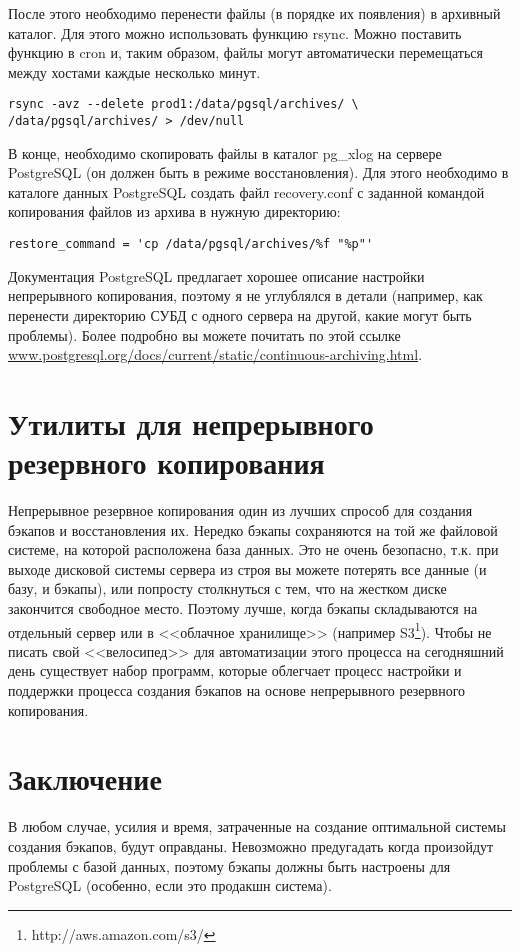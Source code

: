 После этого необходимо перенести файлы (в порядке их появления) в архивный каталог.
Для этого можно использовать функцию rsync.
Можно поставить функцию в cron и, таким образом, файлы могут автоматически перемещаться между
хостами каждые несколько минут.
\begin{lstlisting}[label=lst:backups16,caption=Копирование WAL файлов на другой хост]
rsync -avz --delete prod1:/data/pgsql/archives/ \
/data/pgsql/archives/ > /dev/null
\end{lstlisting}

В конце, необходимо скопировать файлы в каталог pg\_xlog на сервере PostgreSQL (он должен быть в режиме восстановления).
Для этого необходимо в каталоге данных PostgreSQL создать файл recovery.conf с заданной командой копирования
файлов из архива в нужную директорию:
\begin{lstlisting}[label=lst:backups17,caption=recovery.conf]
restore_command = 'cp /data/pgsql/archives/%f "%p"'
\end{lstlisting}

Документация PostgreSQL предлагает хорошее описание настройки непрерывного копирования, поэтому я не углублялся в детали
(например, как перенести директорию СУБД с одного сервера на другой, какие могут быть проблемы). Более подробно вы
можете почитать по этой ссылке \href{http://www.postgresql.org/docs/current/static/continuous-archiving.html}{www.postgresql.org/docs/current/static/continuous-archiving.html}.

\section{Утилиты для непрерывного резервного копирования}
Непрерывное резервное копирования один из лучших спрособ для создания бэкапов и восстановления их. Нередко бэкапы сохраняются на той же файловой системе, на которой расположена база данных. Это не очень безопасно, т.к. при выходе дисковой системы сервера из строя вы можете потерять все данные (и базу, и бэкапы), или попросту столкнуться с тем, что на жестком диске закончится свободное место. Поэтому лучше, когда бэкапы складываются на отдельный сервер или в <<облачное хранилище>> (например S3\footnote{http://aws.amazon.com/s3/}). Чтобы не писать свой <<велосипед>> для автоматизации этого процесса на сегодняшний день существует набор программ, которые облегчает процесс настройки и поддержки процесса создания бэкапов на основе непрерывного резервного копирования.




\section{Заключение}
В любом случае, усилия и время, затраченные на создание оптимальной системы создания бэкапов, будут оправданы.
Невозможно предугадать когда произойдут проблемы с базой данных, поэтому бэкапы должны быть настроены для PostgreSQL
(особенно, если это продакшн система).